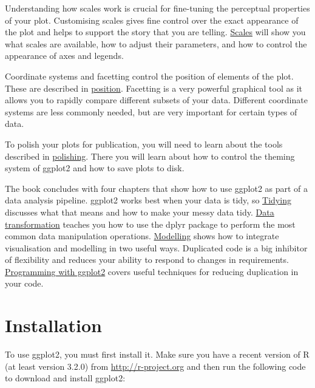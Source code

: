 Understanding how scales work is crucial for fine-tuning the perceptual
properties of your plot. Customising scales gives fine control over the
exact appearance of the plot and helps to support the story that you are
telling. \protect\hyperlink{cha:scales}{Scales} will show you what
scales are available, how to adjust their parameters, and how to control
the appearance of axes and legends.

Coordinate systems and facetting control the position of elements of the
plot. These are described in \protect\hyperlink{cha:position}{position}.
Facetting is a very powerful graphical tool as it allows you to rapidly
compare different subsets of your data. Different coordinate systems are
less commonly needed, but are very important for certain types of data.

To polish your plots for publication, you will need to learn about the
tools described in \protect\hyperlink{cha:polishing}{polishing}. There
you will learn about how to control the theming system of ggplot2 and
how to save plots to disk.

The book concludes with four chapters that show how to use ggplot2 as
part of a data analysis pipeline. ggplot2 works best when your data is
tidy, so \protect\hyperlink{cha:data}{Tidying} discusses what that means
and how to make your messy data tidy. \protect\hyperlink{cha:dplyr}{Data
transformation} teaches you how to use the dplyr package to perform the
most common data manipulation operations.
\protect\hyperlink{cha:modelling}{Modelling} shows how to integrate
visualisation and modelling in two useful ways. Duplicated code is a big
inhibitor of flexibility and reduces your ability to respond to changes
in requirements. \protect\hyperlink{cha:programming}{Programming with
ggplot2} covers useful techniques for reducing duplication in your code.

\section{Installation}\label{sec:installation}


To use ggplot2, you must first install it. Make sure you have a recent
version of R (at least version 3.2.0) from \url{http://r-project.org}
and then run the following code to download and install ggplot2:

\begin{Shaded}
\begin{Highlighting}[]
\NormalTok{(}\NormalTok{)}
\end{Highlighting}
\end{Shaded}

